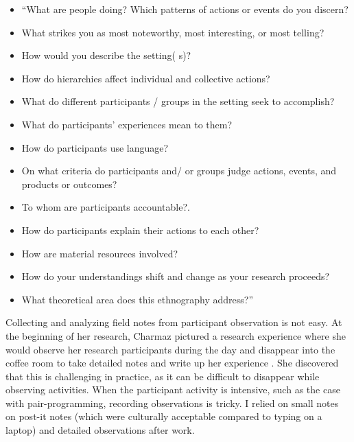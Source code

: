 
\begin{itemize}
\item ``What are people doing? Which patterns of actions or events do you discern?
\item What strikes you as most noteworthy, most interesting, or most telling?
\item How would you describe the setting( s)?
\item How do hierarchies affect individual and collective actions?
\item What do different participants / groups in the setting seek to accomplish?
\item What do participants’ experiences mean to them?
\item How do participants use language?
\item On what criteria do participants and/ or groups judge actions, events, and products or outcomes?
\item To whom are participants accountable?.
\item How do participants explain their actions to each other?
\item How are material resources involved?
\item How do your understandings shift and change as your research proceeds?
\item What theoretical area does this ethnography address?'' \cite{Charmaz}
\end{itemize}

Collecting and analyzing field notes from participant observation is not easy. At the beginning of her research, Charmaz pictured a research experience where she would observe her research participants during the day and disappear into the coffee room to take detailed notes and write up her experience \cite{Charmaz}. She discovered that this is challenging in practice, as it can be difficult to disappear while observing activities. When the participant activity is intensive, such as the case with pair-programming, recording observations is tricky. I relied on small notes on post-it notes (which were culturally acceptable compared to typing on a laptop) and detailed observations after work.

